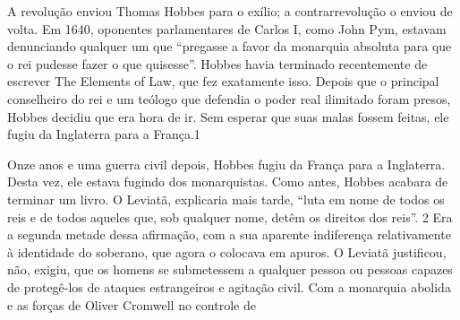  \par 
A revolução enviou Thomas Hobbes para o exílio; a contrarrevolução o enviou de volta. Em 1640, oponentes parlamentares de Carlos I, como John Pym, estavam denunciando qualquer um que “pregasse a favor da monarquia absoluta para que o rei pudesse fazer o que quisesse”. Hobbes havia terminado recentemente de escrever The Elements of Law, que fez exatamente isso. Depois que o principal conselheiro do rei e um teólogo que defendia o poder real ilimitado foram presos, Hobbes decidiu que era hora de ir. Sem esperar que suas malas fossem feitas, ele fugiu da Inglaterra para a França.{\color{blue}1}
 \par 
Onze anos e uma guerra civil depois, Hobbes fugiu da França para a Inglaterra. Desta vez, ele estava fugindo dos monarquistas. Como antes, Hobbes acabara de terminar um livro. O Leviatã, explicaria mais tarde, “luta em nome de todos os reis e de todos aqueles que, sob qualquer nome, detêm os direitos dos reis”. {\color{blue}2} Era a segunda metade dessa afirmação, com a sua aparente indiferença relativamente à identidade do soberano, que agora o colocava em apuros. O Leviatã justificou, não, exigiu, que os homens se submetessem a qualquer pessoa ou pessoas capazes de protegê-los de ataques estrangeiros e agitação civil. Com a monarquia abolida e as forças de Oliver Cromwell no controle de
